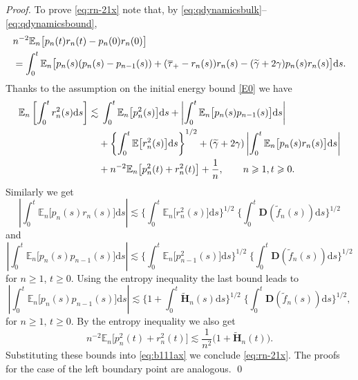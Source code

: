 \documentclass[EJP]{ejpecp} %
\newcommand\E{{\mathbb E}}
\newcommand\bbE{{\mathbb E}}
\renewcommand{\ge}{\geqslant}
\newcommand{\dd  }{\mathrm{d}}
\renewcommand{\tilde}{\widetilde}
\renewcommand{\bar}{\overline}
\numberwithin{equation}{section}
\begin{document}
\begin{proof}
To prove \eqref{eq:rn-21x} note that, by \eqref{eq:qdynamicsbulk}--\eqref{eq:qdynamicsbound}, 
\begin{align}
&     n^{-2} \bbE_n\big[p_n(t) r_n(t)-p_n(0) r_n(0)\big]\label{eq:b111x} \\
&= \int_0^t \bbE_n\big[p_n(s)(p_{n}(s) - p_{n-1}(s)) + (\bar\tau_+-r_n(s)) r_n(s) - (\tilde\gamma +2\gamma)
    p_n(s) r_n(s) \big]\dd s .\notag
  \end{align}
Thanks to the assumption on the initial energy bound \eqref{E0} we have
\begin{align}
  \E_n \left[\int_0^t r_n^2(s) \dd s \right]\lesssim  & \;  \int_0^t \E_n\big[ p_n^2(s)\big]\dd s
  +\left|\int_0^t \E_n \big[p_{n}(s) p_{n-1}(s)\big]\dd s\right| \notag \\ 
  & + \left\{\int_0^t \E\big[r_n^2(s)\big]\dd s\right\}^{1/2} \notag + (\tilde\gamma +2\gamma)
   \left|\int_0^t \bbE_n\big[ p_n(s) r_n(s)\big]\dd s\right| \notag \\
   & +n^{-2}\E_n\big[ p_n^2(t)+ r_n^2(t)\big]+\frac{1}{n}, \qquad n\ge1, t\ge0.\label{eq:b111ax}
  \end{align}
Similarly we get
\begin{equation}
\label{041401-20}
\left|\int_0^t \E_n\big[ p_n(s)r_n(s)\big]\dd s\right|\lesssim\bigg\{\int_0^t \E_n \big[r_n^2(s)\big]\dd s\bigg\}^{1/2}\;\bigg\{\int_0^t \mathbf D(\tilde f_n(s))\dd s\bigg\}^{1/2}
\end{equation}
and
$$
\left|\int_0^t \E_n\big[ p_n(s)p_{n-1}(s)\big]\dd s\right|\lesssim\bigg\{\int_0^t \E_n \big[p_{n-1}^2(s)\big]\dd s\bigg\}^{1/2}\;\bigg\{\int_0^t \mathbf D(\tilde f_n(s))\dd s\bigg\}^{1/2}
$$
for $n\ge1$, $t\ge0$.
Using the entropy inequality the last bound leads to 
\begin{equation}
\label{051401-20}
\left|\int_0^t \E_n\big[ p_n(s)p_{n-1}(s)\big]\dd
  s\right|\lesssim\bigg\{1+\int_0^t\tilde{\mathbf{H}}_n(s)\dd
s\bigg\}^{1/2}\;\bigg\{\int_0^t \mathbf D(\tilde f_n(s))\dd
s\bigg\}^{1/2},
\end{equation}
for $n\ge1, \,t\ge0.$
By the entropy inequality we  also get
\begin{equation}
\label{061401-20} 
n^{-2}\E_n\Big[ p_n^2(t)+ r_n^2(t)\Big]\lesssim \frac{1}{n^2}\Big(1+\tilde{\mathbf{H}}_n(t)\Big).
\end{equation}
Substituting these bounds into \eqref{eq:b111ax} we conclude
\eqref{eq:rn-21x}. The proofs for the case of the left boundary point are analogous.
\qed

\bigskip


\end{proof}
\end{document}
